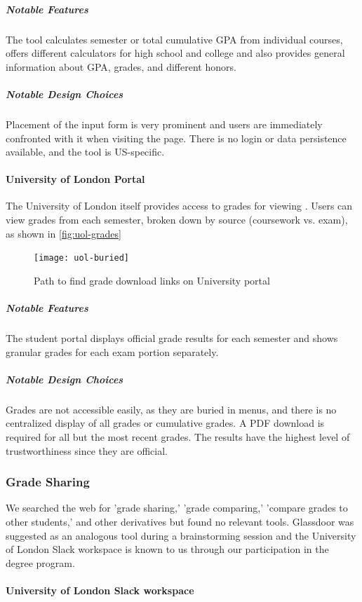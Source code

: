 \subparagraph{Notable Features}
The tool calculates semester or total cumulative GPA from individual courses, offers different calculators for high school and college and also provides general information about GPA, grades, and different honors.

\subparagraph{Notable Design Choices}
Placement of the input form is very prominent and users are immediately confronted with it when visiting the page. There is no login or data persistence available, and the tool is US-specific.

\paragraph{University of London Portal}

The University of London itself provides access to grades for viewing \cite{uol}. Users can view grades from each semester, broken down by source (coursework vs. exam), as shown in \autoref{fig:uol-grades}

\begin{figure}[H]
\noindent \texttt{[image: uol-buried]}
\centering
\caption{Path to find grade download links on University portal}
\label{fig:uol-grades}
\end{figure}

\subparagraph{Notable Features}
The student portal displays official grade results for each semester and shows granular grades for each exam portion separately.

\subparagraph{Notable Design Choices}
Grades are not accessible easily, as they are buried in menus, and there is no centralized display of all grades or cumulative grades. A PDF download is required for all but the most recent grades. The results have the highest level of trustworthiness since they are official.

\subsubsection{Grade Sharing}

We searched the web for 'grade sharing,' 'grade comparing,' 'compare grades to other students,' and other derivatives but found no relevant tools. Glassdoor was suggested as an analogous tool during a brainstorming session and the University of London Slack workspace is known to us through our participation in the degree program.

\paragraph{University of London Slack workspace}

